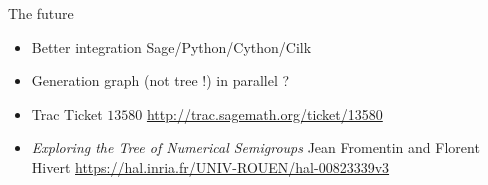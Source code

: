 \documentclass[compress,11pt]{beamer}
\begin{document}
\begin{frame}{The future}

  \begin{itemize}
  \item Better integration Sage/Python/Cython/Cilk
    \bigskip

  \item Generation graph (not tree !) in parallel ?
  \end{itemize}
  \bigskip  \bigskip

  \begin{itemize}
  \item Trac Ticket $13580$ \url{http://trac.sagemath.org/ticket/13580}
    \bigskip

  \item \textit{Exploring the Tree of Numerical Semigroups}
    Jean Fromentin and Florent Hivert
    \url{https://hal.inria.fr/UNIV-ROUEN/hal-00823339v3}

  \end{itemize}
\end{frame}
\end{document}
